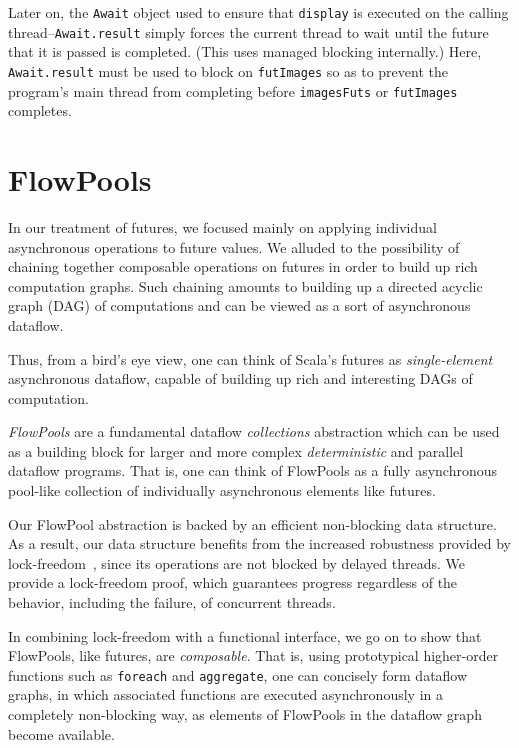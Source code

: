 Later on, the \verb|Await| object used to ensure that \verb|display| is executed
on the calling thread--\verb|Await.result| simply forces the current thread to
wait until the future that it is passed is completed. (This uses managed
blocking internally.) Here, \verb|Await.result| must be used to block on
\verb|futImages| so as to prevent the program's main thread from completing
before \verb|imagesFuts| or \verb|futImages| completes.


\section{FlowPools}
\label{sec:flowpools}

In our treatment of futures, we focused mainly on applying individual
asynchronous operations to future values. We alluded to the possibility of
chaining together composable operations on futures in order to build up rich
computation graphs. Such chaining amounts to building up a directed acyclic
graph (DAG) of computations and can be viewed as a sort of asynchronous
dataflow.

Thus, from a bird's eye view, one can think of Scala's futures as {\em
single-element} asynchronous dataflow, capable of building up rich and
interesting DAGs of computation.

{\em FlowPools} are a fundamental dataflow {\em collections} abstraction which
can be used as a building block for larger and more complex
\textit{deterministic} and parallel dataflow programs. That is, one can think of
FlowPools as a fully asynchronous pool-like collection of individually
asynchronous elements like futures.

Our FlowPool abstraction is backed by an efficient non-blocking data structure.
As a result, our data structure benefits from the increased robustness
provided by lock-freedom~\cite{Herlihy90}, since its operations are not blocked
by delayed threads. We provide a lock-freedom proof, which guarantees progress
regardless of the behavior, including the failure, of concurrent threads.

In combining lock-freedom with a functional interface, we go on to show that
FlowPools, like futures, are \textit{composable}. That is, using prototypical
higher-order functions such as \verb=foreach= and \verb=aggregate=, one can
concisely form dataflow graphs, in which associated functions are executed
asynchronously in a completely non-blocking way, as elements of FlowPools in the
dataflow graph become available.

